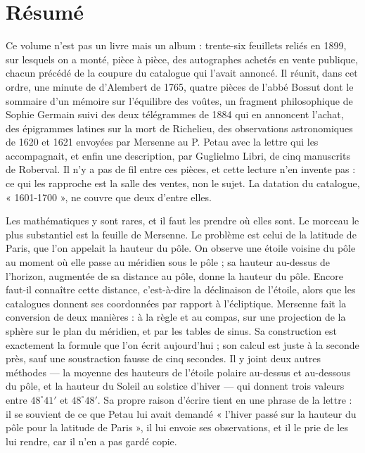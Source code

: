 \documentclass[11pt,a4paper]{article}
\begin{document}
\section*{Résumé}

\begin{resume}
Ce volume n'est pas un livre mais un album : trente-six feuillets reliés en
1899, sur lesquels on a monté, pièce à pièce, des autographes achetés en vente
publique, chacun précédé de la coupure du catalogue qui l'avait annoncé. Il
réunit, dans cet ordre, une minute de d'Alembert de 1765, quatre pièces de
l'abbé Bossut dont le sommaire d'un mémoire sur l'équilibre des voûtes, un
fragment philosophique de Sophie Germain suivi des deux télégrammes de 1884
qui en annoncent l'achat, des épigrammes latines sur la mort de Richelieu,
des observations astronomiques de 1620 et 1621 envoyées par Mersenne au
P. Petau avec la lettre qui les accompagnait, et enfin une description, par
Guglielmo Libri, de cinq manuscrits de Roberval. Il n'y a pas de fil entre
ces pièces, et cette lecture n'en invente pas : ce qui les rapproche est la
salle des ventes, non le sujet. La datation du catalogue, « 1601-1700 », ne
couvre que deux d'entre elles.

Les mathématiques y sont rares, et il faut les prendre où elles sont. Le
morceau le plus substantiel est la feuille de Mersenne. Le problème est celui
de la latitude de Paris, que l'on appelait la hauteur du pôle. On observe une
étoile voisine du pôle au moment où elle passe au méridien sous le pôle ; sa
hauteur au-dessus de l'horizon, augmentée de sa distance au pôle, donne la
hauteur du pôle. Encore faut-il connaître cette distance, c'est-à-dire la
déclinaison de l'étoile, alors que les catalogues donnent ses coordonnées par
rapport à l'écliptique. Mersenne fait la conversion de deux manières : à la
règle et au compas, sur une projection de la sphère sur le plan du méridien,
et par les tables de sinus. Sa construction est exactement la formule que
l'on écrit aujourd'hui ; son calcul est juste à la seconde près, sauf une
soustraction fausse de cinq secondes. Il y joint deux autres méthodes — la
moyenne des hauteurs de l'étoile polaire au-dessus et au-dessous du pôle, et
la hauteur du Soleil au solstice d'hiver — qui donnent trois valeurs entre
$48^\circ 41'$ et $48^\circ 48'$. Sa propre raison d'écrire tient en une
phrase de la lettre : il se souvient de ce que Petau lui avait demandé
« l'hiver passé sur la hauteur du pôle pour la latitude de Paris », il lui
envoie ses observations, et il le prie de les lui rendre, car il n'en a pas
gardé copie.


\end{resume}
\end{document}
